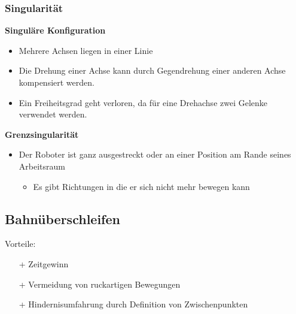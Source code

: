 \subsubsection{Singularität}
\begin{minipage}{0.5\linewidth}
    \textbf{Singuläre Konfiguration}
    \begin{itemize}
        \item Mehrere Achsen liegen in einer Linie
        \item Die Drehung einer Achse kann durch Gegendrehung einer anderen Achse kompensiert werden.
        \item Ein Freiheitsgrad geht verloren, da für eine Drehachse zwei Gelenke verwendet werden.
    \end{itemize}
\end{minipage}
\begin{minipage}{0.5\linewidth}
    \textbf{Grenzsingularität}\newline
    \begin{itemize}
        \item Der Roboter ist ganz ausgestreckt oder an einer Position am Rande seines Arbeitsraum
        \begin{itemize}
            \item Es gibt Richtungen in die er sich nicht mehr bewegen kann
        \end{itemize}
    \end{itemize}
\end{minipage}

\subsection{Bahnüberschleifen}
Vorteile:
\begin{itemize}
    \item[+] Zeitgewinn
    \item[+] Vermeidung von ruckartigen Bewegungen
    \item[+] Hindernisumfahrung durch Definition von Zwischenpunkten 
\end{itemize}


